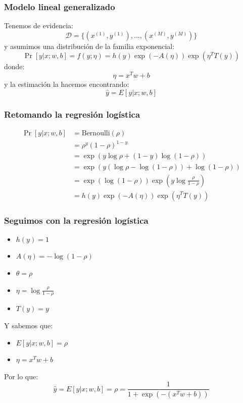 \documentclass{beamer}
\begin{document}
\begin{frame}
  \frametitle{Modelo lineal generalizado}

  Tenemos de evidencia:
  $$  
  \mathcal{D} = \{(x^{(1)}, y^{(1)}), \ldots, (x^{(M)}, y^{(M)})\} 
  $$ 
  y asumimos una distribución de la familia exponencial:
  $$
  \Pr[y | x; w, b] = f(y; \eta) = h(y) \exp(-A(\eta)) \exp(\eta^T T(y))
  $$
  donde:
  $$
  \eta = x^T w + b
  $$
  y la estimación la hacemos encontrando:
  $$
  \hat{y} = E[y | x; w, b]
  $$
\end{frame}

\begin{frame}
  \frametitle{Retomando la regresión logística}

  \begin{align*}
    \Pr[y | x; w, b] &= \text{Bernoulli}(\rho) \\
    &= \rho^{y} (1 - \rho)^{1 - y} \\
    &= \exp(y \log \rho + (1 - y) \log (1 - \rho)) \\
    &= \exp(y (\log \rho - \log (1 - \rho)) + \log (1 - \rho)) \\
    &= \exp(\log (1 - \rho)) \exp(y \log \frac{\rho}{1 - \rho}) \\
    &= h(y) \exp(-A(\eta)) \exp(\eta^T T(y))
  \end{align*}

\end{frame}

\begin{frame}
  \frametitle{Seguimos con la regresión logística}

  \begin{itemize}
    \item $h(y) = 1$
    \item $A(\eta) = -\log (1 - \rho)$
    \item $\theta = \rho$
    \item $\eta = \log \frac{\rho}{1 - \rho}$
    \item $T(y) = y$
  \end{itemize}

  Y sabemos que:
  \begin{itemize}
    \item $E[y | x; w, b] = \rho$
    \item $\eta = x^T w + b$
  \end{itemize}

  Por lo que:
  $$
  \hat{y} = E[y | x; w, b] = \rho = \frac{1}{1 + \exp(-(x^T w + b))}
  $$
\end{frame}
\end{document}
